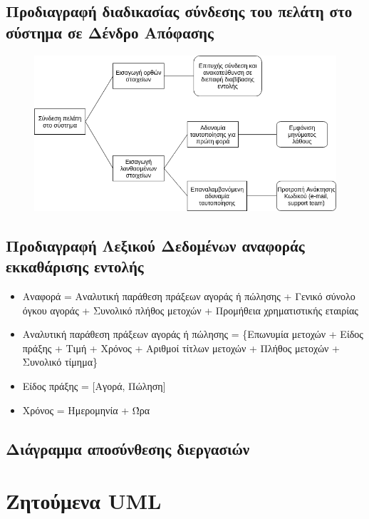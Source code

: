 \documentclass{article}
\begin{document}
\subsection{Προδιαγραφή διαδικασίας σύνδεσης του πελάτη στο σύστημα σε Δένδρο Απόφασης}
\begin{figure}[!h]
	\includegraphics[width=\linewidth]{../Structured_Analysis/Decision_Tree.png}
\end{figure}

\subsection{Προδιαγραφή Λεξικού Δεδομένων αναφοράς εκκαθάρισης εντολής}
\begin{itemize}
\item Αναφορά = Αναλυτική παράθεση πράξεων αγοράς ή πώλησης + Γενικό σύνολο όγκου αγοράς + 
Συνολικό πλήθος μετοχών + Προμήθεια χρηματιστικής εταιρίας
\item Αναλυτική παράθεση πράξεων αγοράς ή πώλησης = \{Επωνυμία μετοχών + Είδος πράξης + Τιμή
 + Χρόνος + Αριθμοί τίτλων μετοχών + Πλήθος μετοχών + Συνολικό τίμημα\}
\item Είδος πράξης = [Αγορά, Πώληση]
\item Χρόνος = Ημερομηνία + Ώρα
\end{itemize}

\newpage
\subsection{Διάγραμμα αποσύνθεσης διεργασιών}

\newpage
\section{Ζητούμενα UML}
\end{document}
